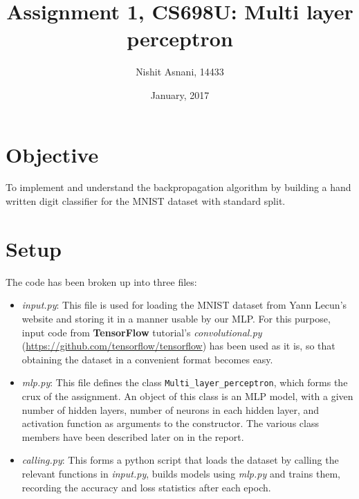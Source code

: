 \documentclass[12pt, a4paper]{article}
\title{\textbf{Assignment 1, CS698U: Multi layer perceptron}}
\author{Nishit Asnani, 14433}
\date{January, 2017}
\begin{document}
\maketitle

\section{Objective}
To implement and understand the backpropagation algorithm by building a hand written digit classifier for the MNIST dataset with standard split.

\section{Setup}
The code has been broken up into three files:

\begin{itemize}
\item \textit{input.py}: This file is used for loading the MNIST dataset from Yann Lecun's website and storing it in a manner usable by our MLP. For this purpose, input code from \textbf{TensorFlow} tutorial's \textit{convolutional.py} (\url{https://github.com/tensorflow/tensorflow}) has been used as it is, so that obtaining the dataset in a convenient format becomes easy. 

\item \textit{mlp.py}: This file defines the class \texttt{Multi\_layer\_perceptron}, which forms the crux of the assignment. An object of this class is an MLP model, with a given number of hidden layers, number of neurons in each hidden layer, and activation function as arguments to the constructor. The various class members have been described later on in the report.

\item \textit{calling.py}: This forms a python script that loads the dataset by calling the relevant functions in \textit{input.py}, builds models using \textit{mlp.py} and trains them, recording the accuracy and loss statistics after each epoch. 

\end{itemize}
\end{document}
